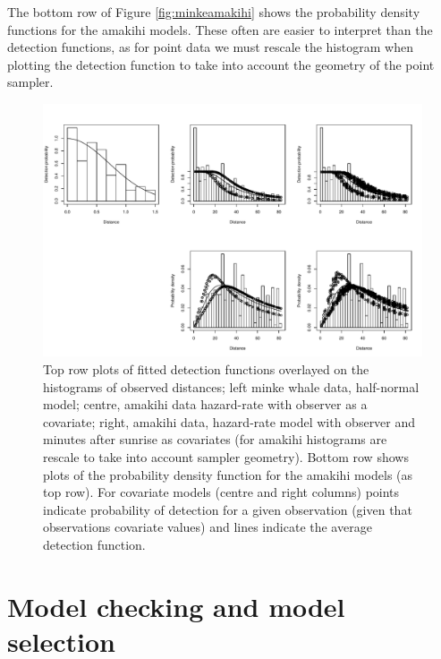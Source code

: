 \documentclass[article]{jss}
\begin{document}
The bottom row of Figure \ref{fig:minkeamakihi} shows the probability
density functions for the amakihi models. These often are easier to
interpret than the detection functions, as for point data we must
rescale the histogram when plotting the detection function to take into
account the geometry of the point sampler.

\begin{CodeChunk}
\begin{figure}

{\centering \includegraphics{paper_files/figure-latex/minke-amakihi-hn-plot-1} 

}

\caption{Top row plots of fitted detection functions overlayed on the histograms of observed distances; left minke whale data, half-normal model; centre, amakihi data hazard-rate with observer as a covariate; right, amakihi data, hazard-rate model with observer and minutes after sunrise as covariates (for amakihi histograms are rescale to take into account sampler geometry). Bottom row shows plots of the probability density function for the amakihi models (as top row). For covariate models (centre and right columns) points indicate probability of detection for a given observation (given that observations covariate values) and lines indicate the average detection function.\label{fig:minkeamakihi}}\label{fig:minke-amakihi-hn-plot}
\end{figure}
\end{CodeChunk}

\section{Model checking and model
selection}\label{model-checking-and-model-selection}
\end{document}

